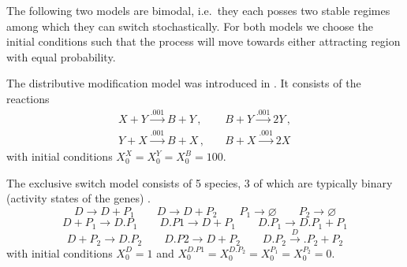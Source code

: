 The following two models are bimodal, i.e.\ they each posses two stable regimes
among which they can switch stochastically.
For both models we choose the initial conditions such that the process
will move towards either attracting region with equal probability.
\begin{model}\label{model:dm}
The distributive modification model was introduced in \citet{cardelli2012cell}.
It consists of the reactions
\begin{align*}
    X + Y \xrightarrow{.001} B + Y\,,\quad
    &B + Y \xrightarrow{.001} 2 Y\,,\\
   Y + X \xrightarrow{.001} B + X\,,\quad
   &B + X \xrightarrow{.001} 2 X
\end{align*}
with initial conditions $X^X_0=X^Y_0=X^B_0=100$.
\end{model}



\begin{model}\label{model:es}
The exclusive switch model consists of 5 species, 3 of which are typically binary (activity states of the genes) \cite{loinger2007stochastic}.
$$ D \xrightarrow{} D + P_1 \qquad D \xrightarrow{} D + P_2 \qquad P_1 \xrightarrow{}\varnothing \qquad P_2 \xrightarrow{} \varnothing $$
$$ D + P_1 \xrightarrow{} D.P_1 \qquad D.P1 \xrightarrow{} D + P_1 \qquad D.P_1 \xrightarrow{} D.P_1 + P_1 $$
$$ D + P_2 \xrightarrow{} D.P_2 \qquad D.P2 \xrightarrow{} D + P_2 \qquad D.P_2 \xrightarrow D.P_2 + P_2 $$
with initial conditions $X^D_0=1$ and $X^{D.P1}_0=X^{D.{P_2}}_0=X^{P_1}_0=X^{P_2}_0=0$.
\end{model}

